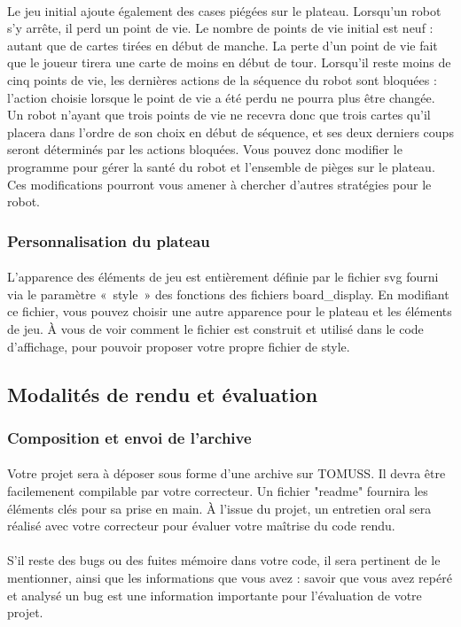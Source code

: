 \documentclass[a4paper]{article}
\begin{document}
\paragraph{}Le jeu initial ajoute également des cases piégées sur le plateau.
Lorsqu'un robot s'y arrête, il perd un point de vie. Le nombre de points de vie
initial est neuf : autant que de cartes tirées en début de manche. La perte d'un
point de vie fait que le joueur tirera une carte de moins en début de tour.
Lorsqu'il reste moins de cinq points de vie, les dernières actions de la
séquence du robot sont bloquées : l'action choisie lorsque le point de vie a été
perdu ne pourra plus être changée. Un robot n'ayant que trois points de vie ne
recevra donc que trois cartes qu'il placera dans l'ordre de son choix en début
de séquence, et ses deux derniers coups seront déterminés par les actions
bloquées. Vous pouvez donc modifier le programme pour gérer la santé du robot et
l'ensemble de pièges sur le plateau. Ces modifications pourront vous amener à
chercher d'autres stratégies pour le robot.

\subsubsection{Personnalisation du plateau}

\paragraph{}L'apparence des éléments de jeu est entièrement définie par le
fichier svg fourni via le paramètre «~style~» des fonctions des fichiers
board\_display. En modifiant ce fichier, vous pouvez choisir une autre apparence
pour le plateau et les éléments de jeu. À vous de voir comment le fichier est
construit et utilisé dans le code d'affichage, pour pouvoir proposer votre
propre fichier de style.

\subsection{Modalités de rendu et évaluation}

\subsubsection{Composition et envoi de l'archive}

\paragraph{}Votre projet sera à déposer sous forme d'une archive sur TOMUSS. Il
devra être facilemenent compilable par votre correcteur. Un fichier "readme"
fournira les éléments clés pour sa prise en main. À l'issue du projet, un
entretien oral sera réalisé avec votre correcteur pour évaluer votre maîtrise du
code rendu.

\paragraph{}S'il reste des bugs ou des fuites mémoire dans votre code, il sera
pertinent de le mentionner, ainsi que les informations que vous avez : savoir
que vous avez repéré et analysé un bug est une information importante pour
l'évaluation de votre projet.
\end{document}
